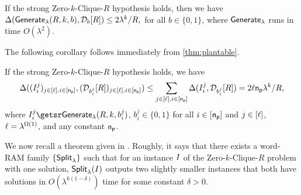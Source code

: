 \begin{theorem}
\label{thm:plantable}
If the strong Zero-$k$-Clique-$R$ hypothesis holds, then we have
	$ \Delta({\mathsf{Generate}}_\lambda(R, k, b), \mathcal{D}_b[R]) \leq 2\lambda^{k}/R,$
	for all $b \in \{0,1\}$, where ${\mathsf{Generate}}_\lambda$ runs in time $O(\lambda^2)$.
\end{theorem}
The following corollary follows immediately from \cref{thm:plantable}.
\begin{corollary}
\label{cor:plantable}
If the strong Zero-$k$-Clique-$R$ hypothesis holds, we have
	$$ \Delta((I^j_i)_{j \in [\ell], i \in [\mathsf{n_p}]}, (\mathcal{D}_{b^j_i}[R])_{j \in [\ell], i \in [\mathsf{n_p}]}) \leq \sum_{j \in [\ell], i \in [\mathsf{n_p}]}\Delta(I^j_i, \mathcal{D}_{b^j_i}[R]) =2\ell\mathsf{n_p}\lambda^{k}/R,$$
	where $\instance^j_i \getsr \Generate(R, k, b^j_i)$, $b^j_i \in \{0,1\}$ for all $i \in [\mathsf{n_p}]$ and $j \in [\ell]$, $\ell = \lambda^{\Omega(1)}$, and any constant $\mathsf{n_p}$.  
\end{corollary}

We now recall a theorem given in \cite{C:LaVLinWil19}. Roughly, it says that there exists a word-RAM family $\{{\mathsf{Split}}_\lambda\}$ such that for an instance $I$ of the Zero-$k$-Clique-$R$ problem with one solution, ${\mathsf{Split}}_\lambda(I)$ outputs two slightly smaller instances that both have solutions in $O(\lambda^{k(1-\delta)})$ time for some constant $\delta > 0$.

